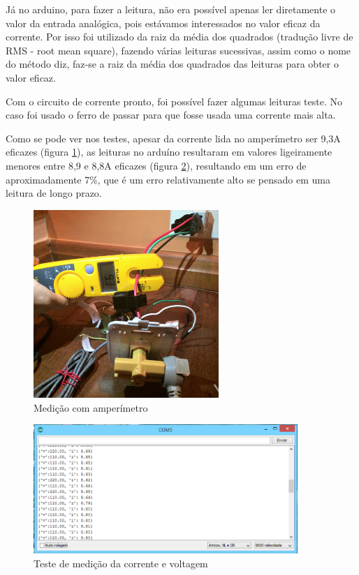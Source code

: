 Já no arduino, para fazer a leitura, não era possível apenas ler diretamente o valor da entrada analógica, pois estávamos interessados no valor eficaz da corrente. Por isso foi utilizado da raiz da média dos quadrados (tradução livre de RMS - root mean square), fazendo várias leituras sucessivas, assim como o nome do método diz, faz-se a raiz da média dos quadrados das leituras para obter o valor eficaz.

Com o circuito de corrente pronto, foi possível fazer algumas leituras teste. No caso foi usado o ferro de passar para que fosse usada uma corrente mais alta. 

Como se pode ver nos testes, apesar da corrente lida no amperímetro ser 9,3A eficazes (figura \ref{fig:teste-amperimetro}), as leituras no arduíno resultaram em valores ligeiramente menores entre 8,9 e 8,8A eficazes (figura \ref{fig:teste-medicao-corrente-voltagem}), resultando em um erro de aproximadamente 7\%, que é um erro relativamente alto se pensado em uma leitura de longo prazo.

\begin{figure}[H]
\centering
\includegraphics[width=7cm,keepaspectratio]{figuras/ferro-passar-amp.jpg} 
\caption{\label{fig:teste-amperimetro} Medição com amperímetro}
\end{figure}

\begin{figure}[H]
\centering
\includegraphics[width=10cm,keepaspectratio]{figuras/ferro-passar.png} 
\caption{\label{fig:teste-medicao-corrente-voltagem} Teste de medição da corrente e voltagem}
\end{figure}

